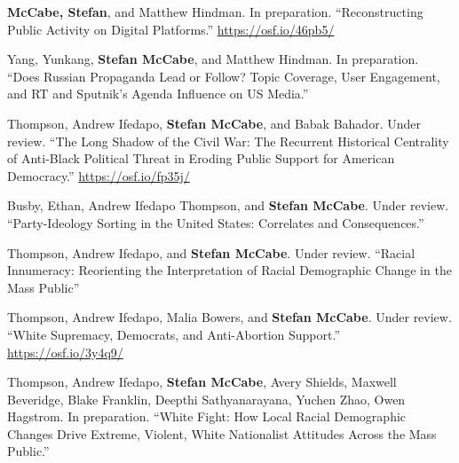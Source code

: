 \documentclass[11pt, letter]{article}
\begin{document}
\begin{hangparas}{.25in}{1}
\textbf{McCabe, Stefan}, and Matthew Hindman. In preparation. ``Reconstructing Public Activity on Digital Platforms.'' \href{https://osf.io/46pb5/}{https://osf.io/46pb5/} \vspace{2mm}

Yang, Yunkang, \textbf{Stefan McCabe}, and Matthew Hindman. In preparation. ``Does Russian Propaganda Lead or Follow? Topic Coverage, User Engagement, and RT and Sputnik’s Agenda Influence on US Media.'' \vspace{2mm}

Thompson, Andrew Ifedapo, \textbf{Stefan McCabe}, and Babak Bahador. Under review. ``The Long Shadow of the Civil War: The Recurrent Historical Centrality of Anti-Black Political Threat in Eroding Public Support for American Democracy.'' \href{https://osf.io/fp35j/}{https://osf.io/fp35j/} \vspace{2mm}

Busby, Ethan, Andrew Ifedapo Thompson, and \textbf{Stefan McCabe}. Under review. ``Party-Ideology Sorting in the United States: Correlates and Consequences.'' \vspace{2mm}

Thompson, Andrew Ifedapo, and \textbf{Stefan McCabe}. Under review. ``Racial Innumeracy: Reorienting the Interpretation of Racial Demographic Change in the Mass Public''  \vspace{2mm}

Thompson, Andrew Ifedapo, Malia Bowers, and \textbf{Stefan McCabe}. Under review. ``White Supremacy, Democrats, and Anti-Abortion Support.'' \href{https://osf.io/3y4q9/}{https://osf.io/3y4q9/} \vspace{2mm}

Thompson, Andrew Ifedapo, \textbf{Stefan McCabe}, Avery Shields, Maxwell Beveridge, Blake Franklin, Deepthi Sathyanarayana, Yuchen Zhao, Owen Hagstrom. In preparation. ``White Fight: How Local Racial Demographic Changes Drive Extreme, Violent, White Nationalist Attitudes Across the Mass Public.''  \vspace{2mm}







\end{hangparas}
\end{document}
